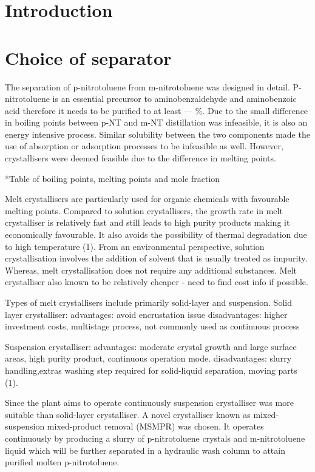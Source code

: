 \section{Introduction}


\section{Choice of separator}
The separation of p-nitrotoluene from m-nitrotoluene was designed in detail. P-nitrotoluene is an essential precursor to aminobenzaldehyde and aminobenzoic acid therefore it needs to be purified to at least --- \%. Due to the small difference in boiling points between p-NT and m-NT distillation was infeasible, it is also an energy intensive process. Similar solubility between the two components made the use of absorption or adsorption processes to be infeasible as well. However, crystallisers were deemed feasible due to the difference in melting points. 

*Table of boiling points, melting points and mole fraction 

Melt crystallisers are particularly used for organic chemicals with favourable melting points. Compared to solution crystallisers, the growth rate in melt crystalliser is relatively fast and still leads to high purity products making it economically favourable. It also avoids the possibility  of thermal degradation  due to high temperature (1). From an environmental perspective, solution crystallisation involves the addition of solvent that is usually treated as impurity. Whereas, melt crystallisation does not require any additional substances. Melt crystalliser also known to be relatively cheaper - need to find cost info if possible.

Types of melt crystallisers include primarily solid-layer and suspension. 
Solid layer crystalliser:
advantages: avoid encrustation issue
disadvantages: higher investment costs, multistage process, not commonly used as continuous process

Suspension crystalliser:
advantages: moderate crystal growth and large surface areas, high purity product, continuous operation mode.
disadvantages: slurry handling,extras washing step required for solid-liquid separation, moving parts (1). 

Since the plant aims to operate continuously suspension crystalliser was more suitable than solid-layer crystalliser. A novel crystalliser known as mixed-suspension mixed-product removal (MSMPR) was chosen. It operates continuously by producing a slurry of p-nitrotoluene crystals and m-nitrotoluene liquid which will be further separated in a hydraulic wash column to attain purified molten p-nitrotoluene. 

